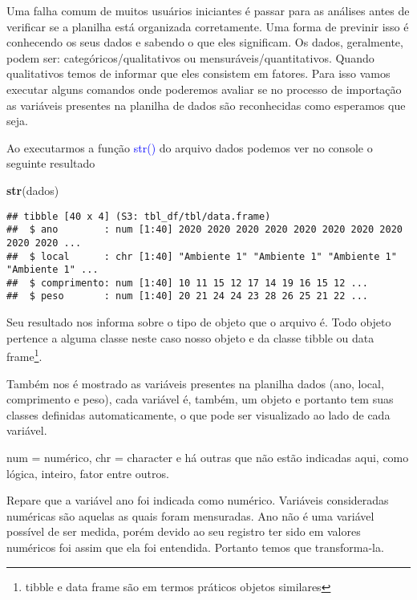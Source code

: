 \documentclass[14pt,titlepage, oneside, openany, a4paper]{book}
\newenvironment{Shaded}{\begin{snugshade}}{\end{snugshade}}
\newcommand{\KeywordTok}[1]{\textcolor[rgb]{0.13,0.29,0.53}{\textbf{#1}}}
\newcommand{\NormalTok}[1]{#1}
\begin{document}
Uma falha comum de muitos usuários iniciantes é passar para as análises antes de verificar se a planilha está organizada corretamente. Uma forma de previnir isso é conhecendo os seus dados e sabendo o que eles significam. Os dados, geralmente, podem ser: categóricos/qualitativos ou mensuráveis/quantitativos. Quando qualitativos temos de informar que eles consistem em fatores. Para isso vamos executar alguns comandos onde poderemos avaliar se no processo de importação as variáveis presentes na planilha de dados são reconhecidas como esperamos que seja.

Ao executarmos a função \textcolor{blue}{str()} do arquivo dados podemos ver no console o seguinte resultado

\begin{Shaded}
\begin{Highlighting}[]
\KeywordTok{str}\NormalTok{(dados)}
\end{Highlighting}
\end{Shaded}

\begin{verbatim}
## tibble [40 x 4] (S3: tbl_df/tbl/data.frame)
##  $ ano        : num [1:40] 2020 2020 2020 2020 2020 2020 2020 2020 2020 2020 ...
##  $ local      : chr [1:40] "Ambiente 1" "Ambiente 1" "Ambiente 1" "Ambiente 1" ...
##  $ comprimento: num [1:40] 10 11 15 12 17 14 19 16 15 12 ...
##  $ peso       : num [1:40] 20 21 24 24 23 28 26 25 21 22 ...
\end{verbatim}

Seu resultado nos informa sobre o tipo de objeto que o arquivo é. Todo objeto pertence a alguma classe neste caso nosso objeto e da classe tibble ou data frame\footnote{tibble e data frame são em termos práticos objetos similares}.

Também nos é mostrado as variáveis presentes na planilha dados (ano, local, comprimento e peso), cada variável é, também, um objeto e portanto tem suas classes definidas automaticamente, o que pode ser visualizado ao lado de cada variável.

num = numérico, chr = character e há outras que não estão indicadas aqui, como lógica, inteiro, fator entre outros.

Repare que a variável ano foi indicada como numérico. Variáveis consideradas numéricas são aquelas as quais foram mensuradas. Ano não é uma variável possível de ser medida, porém devido ao seu registro ter sido em valores numéricos foi assim que ela foi entendida. Portanto temos que transforma-la.
\end{document}
